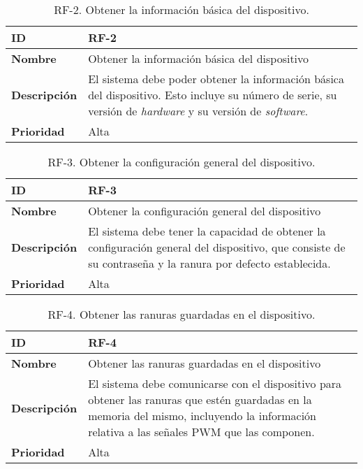 \begin{table}[h!]
    \centering
    \caption{RF-2. Obtener la información básica del dispositivo.}
    \begin{tabular}{|m{2.5cm}|m{9.27cm}|}
        \hline
        \textbf{ID} & RF-2 \\
        \hline
        \textbf{Nombre} & Obtener la información básica del dispositivo \\
        \hline
        \textbf{Descripción} & El sistema debe poder obtener la información básica del dispositivo. Esto incluye su número de serie, su versión de \textit{hardware} y su versión de \textit{software}. \\
        \hline
        \textbf{Prioridad} & Alta \\
        \hline
    \end{tabular}
\end{table}

\begin{table}[h!]
    \centering
    \caption{RF-3. Obtener la configuración general del dispositivo.}
    \begin{tabular}{|m{2.5cm}|m{9.27cm}|}
        \hline
        \textbf{ID} & RF-3 \\
        \hline
        \textbf{Nombre} & Obtener la configuración general del dispositivo \\
        \hline
        \textbf{Descripción} & El sistema debe tener la capacidad de obtener la configuración general del dispositivo, que consiste de su contraseña y la ranura por defecto establecida. \\
        \hline
        \textbf{Prioridad} & Alta \\
        \hline
    \end{tabular}
\end{table}

\begin{table}[h!]
    \centering
    \caption{RF-4. Obtener las ranuras guardadas en el dispositivo.}
    \begin{tabular}{|m{2.5cm}|m{9.27cm}|}
        \hline
        \textbf{ID} & RF-4 \\
        \hline
        \textbf{Nombre} & Obtener las ranuras guardadas en el dispositivo \\
        \hline
        \textbf{Descripción} & El sistema debe comunicarse con el dispositivo para obtener las ranuras que estén guardadas en la memoria del mismo, incluyendo la información relativa a las señales PWM que las componen. \\
        \hline
        \textbf{Prioridad} & Alta \\
        \hline
    \end{tabular}
\end{table}


